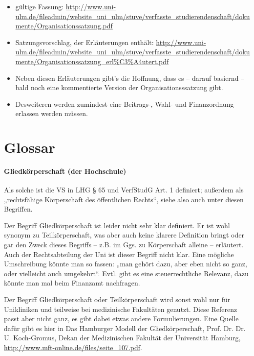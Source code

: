 \documentclass[
10pt,
a4paper,
twoside,								%
titlepage=false,							%
draft=false								%
]{scrartcl}
\begin{document}
\begin{itemize}
	\item gültige Fassung: \url{http://www.uni-ulm.de/fileadmin/website_uni_ulm/stuve/verfasste_studierendenschaft/dokumente/Organisationssatzung.pdf}
	\item Satzungsvorschlag, der Erläuterungen enthält: \url{http://www.uni-ulm.de/fileadmin/website_uni_ulm/stuve/verfasste_studierendenschaft/dokumente/Organisationssatzung_erl%C3%A4utert.pdf}
	\item Neben diesen Erläuterungen gibt's die Hoffnung, dass es – darauf basiernd – bald noch eine kommentierte Version der Organisationsssatzung gibt.
	\item Desweiteren werden zumindest eine Beitrags-, Wahl- und Finanzordnung erlassen werden müssen.
\end{itemize}



\section{Glossar}


\paragraph{Gliedkörperschaft (der Hochschule)}

Als solche ist die VS in LHG § 65 und VerfStudG Art. 1 definiert; außerdem als „rechtsfähige Körperschaft des öffentlichen Rechts“, siehe also auch unter diesen Begriffen.

Der Begriff Gliedkörperschaft ist leider nicht sehr klar definiert. Er ist wohl synonym zu Teilkörperschaft, was aber auch keine klarere Definition bringt oder gar den Zweck dieses Begriffs – z.B. im Ggs. zu Körperschaft alleine – erläutert. Auch der Rechtsabteilung der Uni ist dieser Begriff nicht klar. Eine mögliche Umschreibung könnte man so fassen: „man gehört dazu, aber eben nicht so ganz, oder vielleicht auch umgekehrt“. Evtl. gibt es eine steuerrechtliche Relevanz, dazu könnte man mal beim Finanzamt nachfragen.

Der Begriff Gliedkörperschaft oder Teilkörperschaft wird sonst wohl nur für Unikliniken und teilweise bei medizinische Fakultäten genutzt. Diese Referenz passt aber nicht ganz, es gibt dabei etwas andere Formulierungen. Eine Quelle dafür gibt es hier in Das Hamburger Modell der Gliedkörperschaft, Prof. Dr. Dr. U. Koch-Gromus, Dekan der Medizinischen Fakultät der Universität Hamburg, \url{http://www.mft-online.de/files/seite_107.pdf}.
\end{document}
